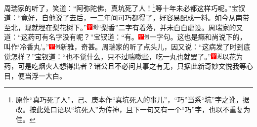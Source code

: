 周瑞家的听了，笑道：“阿弥陀佛，真坑死了人！\footnote{原作“真巧死了人”，己、庚本作“真坑死人的事儿”，“巧”当系“坑”字之讹，据改。按此处口语以“坑死人”为传神，且下一句又有一个“巧”字，也以不重复为佳。}等十年未必都这样巧呢。”宝钗道：“竟好，自他说了去后，一二年间可巧都得了，好容易配成一料。如今从南带至北，现就埋在梨花树下。”{\includegraphics[width=3mm]{../Images/00002}\includegraphics[width=3mm]{../Images/00011}\footnotesize \kaishu “梨香”二字有着落，并未白白虚设。}周瑞家的又道：“这药可有名字没有呢？”宝钗道：“有。{\includegraphics[width=3mm]{../Images/00002}\includegraphics[width=3mm]{../Images/00011}\footnotesize \kaishu 一字句。}这也是癞和尚说下的，叫作‘冷香丸’。”{\includegraphics[width=3mm]{../Images/00002}\includegraphics[width=3mm]{../Images/00011}\footnotesize \kaishu 新雅，奇甚。}周瑞家的听了点头儿，因又说：“这病发了时到底觉怎样？”宝钗道：“也不觉什么，只不过喘嗽些，吃一丸也就罢了。”{\includegraphics[width=3mm]{../Images/00002}\includegraphics[width=3mm]{../Images/00012}\footnotesize \kaishu 以花为药，可是吃烟火人想得出者？诸公且不必问其事之有无，只据此新奇妙文悦我等心目，便当浮一大白。}


